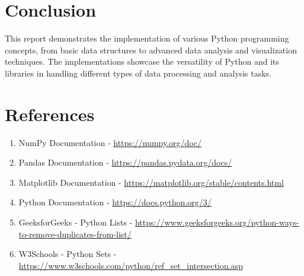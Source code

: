 \documentclass[12pt]{article}
\begin{document}
\section{Conclusion}
This report demonstrates the implementation of various Python programming concepts, from basic data structures to advanced data analysis and visualization techniques. The implementations showcase the versatility of Python and its libraries in handling different types of data processing and analysis tasks.

\section{References}
\begin{enumerate}
    \item NumPy Documentation - \url{https://numpy.org/doc/}
    \item Pandas Documentation - \url{https://pandas.pydata.org/docs/}
    \item Matplotlib Documentation - \url{https://matplotlib.org/stable/contents.html}
    \item Python Documentation - \url{https://docs.python.org/3/}
    \item GeeksforGeeks - Python Lists - \url{https://www.geeksforgeeks.org/python-ways-to-remove-duplicates-from-list/}
    \item W3Schools - Python Sets - \url{https://www.w3schools.com/python/ref_set_intersection.asp}
\end{enumerate}
\end{document}
